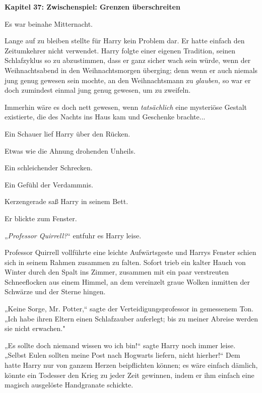 

\hypertarget{zwischenspiel-grenzen-uxfcberschreiten}{%

\textbf{Kapitel 37: Zwischenspiel: Grenzen überschreiten}

Es war beinahe Mitternacht.

Lange auf zu bleiben stellte für Harry kein Problem dar. Er hatte einfach den Zeitumkehrer nicht verwendet. Harry folgte einer eigenen Tradition, seinen Schlafzyklus so zu abzustimmen, dass er ganz sicher wach sein würde, wenn der Weihnachtsabend in den Weihnachtsmorgen überging; denn wenn er auch niemals jung genug gewesen sein mochte, an den Weihnachtsmann zu \emph{glauben,} so war er doch zumindest einmal jung genug gewesen, um zu zweifeln.

Immerhin wäre es doch nett gewesen, wenn \emph{tatsächlich} eine mysteriöse Gestalt existierte, die des Nachts ins Haus kam und Geschenke brachte...

Ein Schauer lief Harry über den Rücken.

Etwas wie die Ahnung drohenden Unheils.

Ein schleichender Schrecken.

Ein Gefühl der Verdammnis.

Kerzengerade saß Harry in seinem Bett.

Er blickte zum Fenster.

„\emph{Professor Quirrell?}“ entfuhr es Harry leise.

Professor Quirrell vollführte eine leichte Aufwärtsgeste und Harrys Fenster schien sich in seinem Rahmen zusammen zu falten. Sofort trieb ein kalter Hauch von Winter durch den Spalt ins Zimmer, zusammen mit ein paar verstreuten Schneeflocken aus einem Himmel, an dem vereinzelt graue Wolken inmitten der Schwärze und der Sterne hingen.

„Keine Sorge, Mr. Potter,“ sagte der Verteidigungsprofessor in gemessenem Ton. „Ich habe ihren Eltern einen Schlafzauber auferlegt; bis zu meiner Abreise werden sie nicht erwachen."

„Es sollte doch niemand wissen wo ich bin!“ sagte Harry noch immer leise. „Selbst Eulen sollten meine Post nach Hogwarts liefern, nicht hierher!“ Dem hatte Harry nur von ganzem Herzen beipflichten können; es wäre einfach dämlich, könnte ein Todesser den Krieg zu jeder Zeit gewinnen, indem er ihm einfach eine magisch ausgelöste Handgranate schickte.

}
